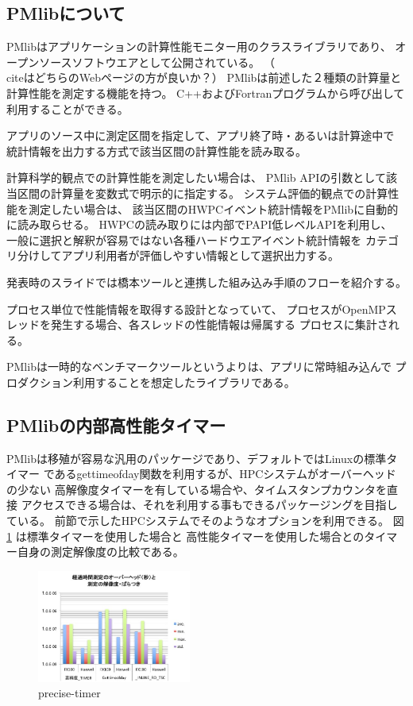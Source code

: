 \documentclass[submit,techrep,noauthor]{ipsj}
\begin{document}
\subsection {PMlibについて}

PMlibはアプリケーションの計算性能モニター用のクラスライブラリであり、
オープンソースソフトウエアとして公開されている。
\cite{PMlib1:webpage} \cite{PMlib2:webpage} 
{ \color{blue}
（\\citeはどちらのWebページの方が良いか？）
}
PMlibは前述した２種類の計算量と計算性能を測定する機能を持つ。
C++およびFortranプログラムから呼び出して利用することができる。

アプリのソース中に測定区間を指定して、アプリ終了時・あるいは計算途中で
統計情報を出力する方式で該当区間の計算性能を読み取る。

計算科学的観点での計算性能を測定したい場合は、
PMlib APIの引数として該当区間の計算量を変数式で明示的に指定する。
システム評価的観点での計算性能を測定したい場合は、
該当区間のHWPCイベント統計情報をPMlibに自動的に読み取らせる。
HWPCの読み取りには内部でPAPI低レベルAPIを利用し、
一般に選択と解釈が容易ではない各種ハードウエアイベント統計情報を
カテゴリ分けしてアプリ利用者が評価しやすい情報として選択出力する。

{ \color{blue} \par
発表時のスライドでは橋本ツールと連携した組み込み手順のフローを紹介する。
\par }

プロセス単位で性能情報を取得する設計となっていて、
プロセスがOpenMPスレッドを発生する場合、各スレッドの性能情報は帰属する
プロセスに集計される。

PMlibは一時的なベンチマークツールというよりは、アプリに常時組み込んで
プロダクション利用することを想定したライブラリである。

\subsection{PMlibの内部高性能タイマー}
PMlibは移殖が容易な汎用のパッケージであり、デフォルトではLinuxの標準タイマー
であるgettimeofday関数を利用するが、HPCシステムがオーバーヘッドの少ない
高解像度タイマーを有している場合や、タイムスタンプカウンタを直接
アクセスできる場合は、それを利用する事もできるパッケージングを目指している。
前節で示したHPCシステムでそのようなオプションを利用できる。
図\ref{fig:precise-timer} は標準タイマーを使用した場合と
高性能タイマーを使用した場合とのタイマー自身の測定解像度の比較である。

\begin{figure}[tb]
\centering\includegraphics[width=0.45\textwidth]{figs/precise-timer.jpg}
\caption{precise-timer}
\label{fig:precise-timer}
\end{figure}
\end{document}
